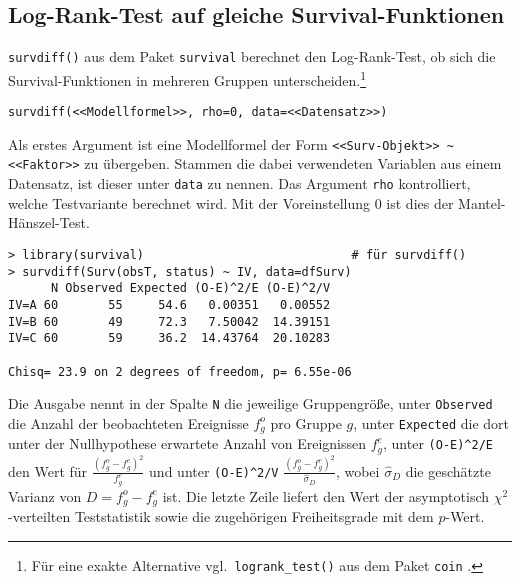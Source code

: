 \subsection{Log-Rank-Test auf gleiche Survival-Funktionen}


\lstinline!survdiff()! aus dem Paket \lstinline!survival! berechnet den Log-Rank-Test, ob sich die Survival-Funktionen in mehreren Gruppen unterscheiden.\footnote{Für eine exakte Alternative vgl.\ \lstinline!logrank_test()! aus dem Paket \lstinline!coin! \cite{Hothorn2008a}.}
\begin{lstlisting}
survdiff(<<Modellformel>>, rho=0, data=<<Datensatz>>)
\end{lstlisting}

Als erstes Argument ist eine Modellformel der Form \lstinline!<<Surv-Objekt>> ~ <<Faktor>>! zu übergeben. Stammen die dabei verwendeten Variablen aus einem Datensatz, ist dieser unter \lstinline!data! zu nennen. Das Argument \lstinline!rho! kontrolliert, welche Testvariante berechnet wird. Mit der Voreinstellung $0$ ist dies der Mantel-Hänszel-Test.
\begin{lstlisting}
> library(survival)                             # für survdiff()
> survdiff(Surv(obsT, status) ~ IV, data=dfSurv)
      N Observed Expected (O-E)^2/E (O-E)^2/V
IV=A 60       55     54.6   0.00351   0.00552
IV=B 60       49     72.3   7.50042  14.39151
IV=C 60       59     36.2  14.43764  20.10283

Chisq= 23.9 on 2 degrees of freedom, p= 6.55e-06
\end{lstlisting}

Die Ausgabe nennt in der Spalte \lstinline!N! die jeweilige Gruppengröße, unter \lstinline!Observed! die Anzahl der beobachteten Ereignisse $f_{g}^{o}$ pro Gruppe $g$, unter \lstinline!Expected! die dort unter der Nullhypothese erwartete Anzahl von Ereignissen $f_{g}^{e}$, unter \lstinline!(O-E)^2/E! den Wert für $\frac{(f_{g}^{o} - f_{g}^{e})^{2}}{f_{g}^{e}}$ und unter \lstinline!(O-E)^2/V! $\frac{(f_{g}^{o} - f_{g}^{e})^{2}}{\hat{\sigma}_{D}}$, wobei $\hat{\sigma}_{D}$ die geschätzte Varianz von $D = f_{g}^{o} - f_{g}^{e}$ ist. Die letzte Zeile liefert den Wert der asymptotisch $\chi^{2}$-verteilten Teststatistik sowie die zugehörigen Freiheitsgrade mit dem $p$-Wert.

